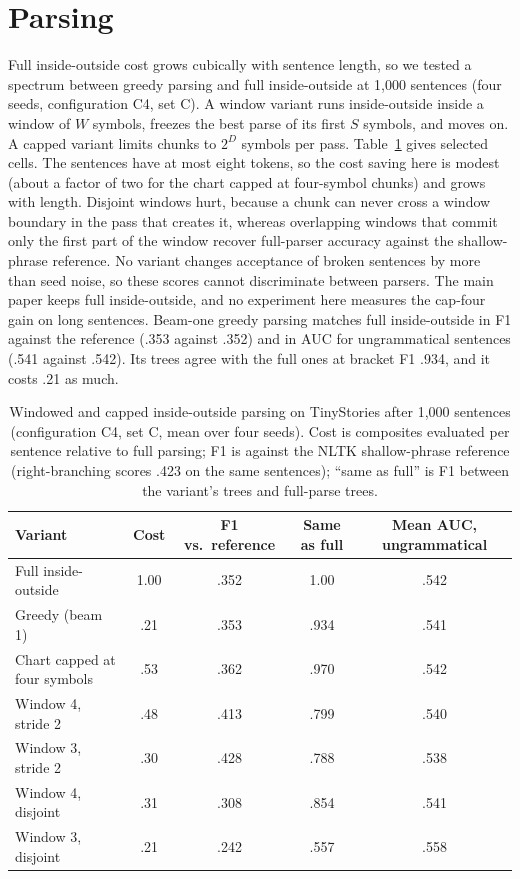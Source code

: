 \documentclass[11pt,letterpaper]{article}
\begin{document}
\section{Parsing}

Full inside-outside cost grows cubically with sentence length, so we tested a spectrum between greedy parsing and full inside-outside at 1,000 sentences (four seeds, configuration C4, set C).
A window variant runs inside-outside inside a window of $W$ symbols, freezes the best parse of its first $S$ symbols, and moves on. A capped variant limits chunks to $2^D$ symbols per pass.
Table~\ref{tab:window} gives selected cells. The sentences have at most eight tokens, so the cost saving here is modest (about a factor of two for the chart capped at four-symbol chunks) and grows with length.
Disjoint windows hurt, because a chunk can never cross a window boundary in the pass that creates it, whereas overlapping windows that commit only the first part of the window recover full-parser accuracy against the shallow-phrase reference.
No variant changes acceptance of broken sentences by more than seed noise, so these scores cannot discriminate between parsers. The main paper keeps full inside-outside, and no experiment here measures the cap-four gain on long sentences.
Beam-one greedy parsing matches full inside-outside in F1 against the reference (.353 against .352) and in AUC for ungrammatical sentences (.541 against .542). Its trees agree with the full ones at bracket F1 .934, and it costs .21 as much.

\begin{table}[h]
\caption{Windowed and capped inside-outside parsing on TinyStories after 1,000 sentences (configuration C4, set C, mean over four seeds). Cost is composites evaluated per sentence relative to full parsing; F1 is against the NLTK shallow-phrase reference
(right-branching scores .423 on the same sentences); ``same as full'' is F1 between the variant's trees and full-parse trees.}
\label{tab:window}
\begin{center}
\small
\begin{tabular}{lcccc}
\toprule
Variant & Cost & F1 vs.\ reference & Same as full & Mean AUC, ungrammatical \\
\midrule
Full inside-outside & 1.00 & .352 & 1.00 & .542 \\
Greedy (beam 1) & .21 & .353 & .934 & .541 \\
Chart capped at four symbols & .53 & .362 & .970 & .542 \\
Window 4, stride 2 & .48 & .413 & .799 & .540 \\
Window 3, stride 2 & .30 & .428 & .788 & .538 \\
Window 4, disjoint & .31 & .308 & .854 & .541 \\
Window 3, disjoint & .21 & .242 & .557 & .558 \\
\bottomrule
\end{tabular}
\end{center}
\end{table}
\end{document}
